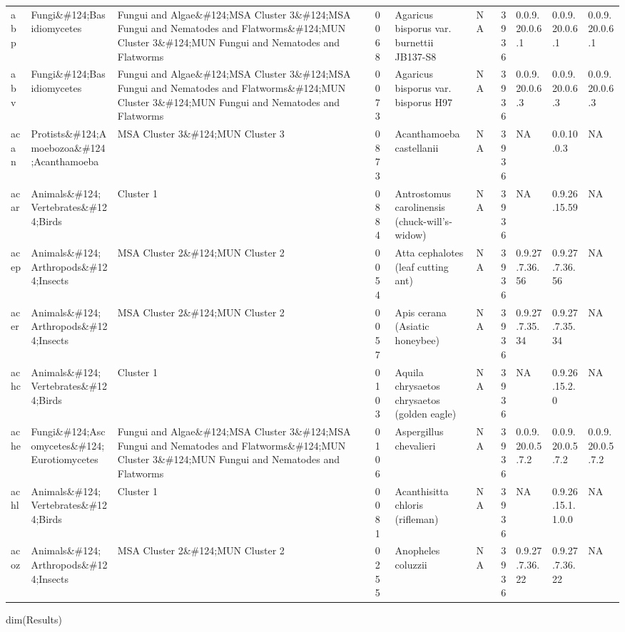 \documentclass[
  letterpaper,
  DIV=11,
  numbers=noendperiod]{scrreprt}
\newenvironment{Shaded}{}{}
\newcommand{\FunctionTok}[1]{\textcolor[rgb]{0.38,0.69,0.94}{#1}}
\newcommand{\NormalTok}[1]{\textcolor[rgb]{0.67,0.70,0.75}{#1}}
\begin{document}
\begin{longtable*}[t]{llllllrlll}
\addlinespace
abp & Fungi\&\#124;Basidiomycetes & Fungui and Algae\&\#124;MSA Cluster 3\&\#124;MSA Fungui and Nematodes and Flatworms\&\#124;MUN Cluster 3\&\#124;MUN Fungui and Nematodes and Flatworms & 0068 & Agaricus bisporus var. burnettii JB137-S8 & NA & 3936 & 0.0.9.20.0.6.1 & 0.0.9.20.0.6.1 & 0.0.9.20.0.6.1\\
abv & Fungi\&\#124;Basidiomycetes & Fungui and Algae\&\#124;MSA Cluster 3\&\#124;MSA Fungui and Nematodes and Flatworms\&\#124;MUN Cluster 3\&\#124;MUN Fungui and Nematodes and Flatworms & 0073 & Agaricus bisporus var. bisporus H97 & NA & 3936 & 0.0.9.20.0.6.3 & 0.0.9.20.0.6.3 & 0.0.9.20.0.6.3\\
acan & Protists\&\#124;Amoebozoa\&\#124;Acanthamoeba & MSA Cluster 3\&\#124;MUN Cluster 3 & 0873 & Acanthamoeba castellanii & NA & 3936 & NA & 0.0.10.0.3 & NA\\
acar & Animals\&\#124;Vertebrates\&\#124;Birds & Cluster 1 & 0884 & Antrostomus carolinensis (chuck-will's-widow) & NA & 3936 & NA & 0.9.26.15.59 & NA\\
acep & Animals\&\#124;Arthropods\&\#124;Insects & MSA Cluster 2\&\#124;MUN Cluster 2 & 0054 & Atta cephalotes (leaf cutting ant) & NA & 3936 & 0.9.27.7.36.56 & 0.9.27.7.36.56 & NA\\
\addlinespace
acer & Animals\&\#124;Arthropods\&\#124;Insects & MSA Cluster 2\&\#124;MUN Cluster 2 & 0057 & Apis cerana (Asiatic honeybee) & NA & 3936 & 0.9.27.7.35.34 & 0.9.27.7.35.34 & NA\\
achc & Animals\&\#124;Vertebrates\&\#124;Birds & Cluster 1 & 0103 & Aquila chrysaetos chrysaetos (golden eagle) & NA & 3936 & NA & 0.9.26.15.2.0 & NA\\
ache & Fungi\&\#124;Ascomycetes\&\#124;Eurotiomycetes & Fungui and Algae\&\#124;MSA Cluster 3\&\#124;MSA Fungui and Nematodes and Flatworms\&\#124;MUN Cluster 3\&\#124;MUN Fungui and Nematodes and Flatworms & 0106 & Aspergillus chevalieri & NA & 3936 & 0.0.9.20.0.5.7.2 & 0.0.9.20.0.5.7.2 & 0.0.9.20.0.5.7.2\\
achl & Animals\&\#124;Vertebrates\&\#124;Birds & Cluster 1 & 0081 & Acanthisitta chloris (rifleman) & NA & 3936 & NA & 0.9.26.15.1.1.0.0 & NA\\
acoz & Animals\&\#124;Arthropods\&\#124;Insects & MSA Cluster 2\&\#124;MUN Cluster 2 & 0255 & Anopheles coluzzii & NA & 3936 & 0.9.27.7.36.22 & 0.9.27.7.36.22 & NA\\
\bottomrule
\end{longtable*}

\begin{Shaded}
\begin{Highlighting}[]
\FunctionTok{dim}\NormalTok{(Results)}
\end{Highlighting}
\end{Shaded}
\end{document}
